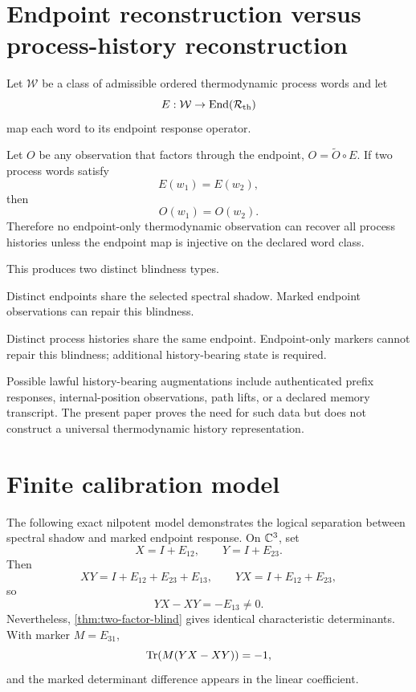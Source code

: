 \section{Endpoint reconstruction versus process-history reconstruction}

Let $\mathcal W$ be a class of admissible ordered thermodynamic process words and let
\[
 E:\mathcal W\to\operatorname{End}(\mathcal R_{\mathrm{th}})
\]
map each word to its endpoint response operator.

\begin{theorem}
Let $O$ be any observation that factors through the endpoint, $O=\widetilde O\circ E$. If two process words satisfy
\[
 E(w_1)=E(w_2),
\]
then
\[
 O(w_1)=O(w_2).
\]
Therefore no endpoint-only thermodynamic observation can recover all process histories unless the endpoint map is injective on the declared word class.
\end{theorem}

This produces two distinct blindness types.

\begin{description}[leftmargin=2.1em,style=nextline]
\item[Type A: endpoint spectral blindness.] Distinct endpoints share the selected spectral shadow. Marked endpoint observations can repair this blindness.
\item[Type B: erased-history blindness.] Distinct process histories share the same endpoint. Endpoint-only markers cannot repair this blindness; additional history-bearing state is required.
\end{description}

Possible lawful history-bearing augmentations include authenticated prefix responses, internal-position observations, path lifts, or a declared memory transcript. The present paper proves the need for such data but does not construct a universal thermodynamic history representation.

\section{Finite calibration model}

The following exact nilpotent model demonstrates the logical separation between spectral shadow and marked endpoint response. On $\mathbb C^3$, set
\[
 X=I+E_{12},
 \qquad
 Y=I+E_{23}.
\]
Then
\[
 XY=I+E_{12}+E_{23}+E_{13},
 \qquad
 YX=I+E_{12}+E_{23},
\]
so
\[
 YX-XY=-E_{13}\ne0.
\]
Nevertheless, \cref{thm:two-factor-blind} gives identical characteristic determinants. With marker $M=E_{31}$,
\[
 \operatorname{Tr}(M(YX-XY))=-1,
\]
and the marked determinant difference appears in the linear coefficient.

